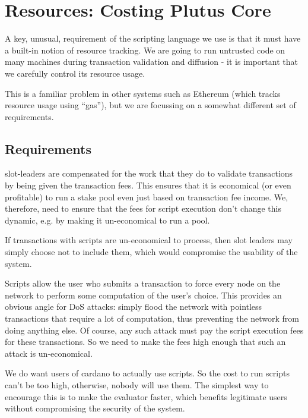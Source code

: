 \section{Resources: Costing Plutus Core}
\label{sec:costing}

A key, unusual, requirement of the scripting language we use is that it must have a built-in notion of resource tracking.
We are going to run untrusted code on many machines during transaction validation and diffusion - it is important that we carefully control its resource usage.

This is a familiar problem in other systems such as Ethereum (which tracks resource usage using ``gas''), but we are focussing on a somewhat different set of requirements.

\subsection{Requirements}
\begin{requirement}
\label{req:costing-profitability}
\Glspl{slot-leader} are compensated for the work that they do to validate transactions by being given the transaction fees.
This ensures that it is economical (or even profitable) to run a stake pool even just based on transaction fee income.
We, therefore, need to ensure that the fees for script execution don't change this dynamic, e.g. by making it un-economical to run a pool.

If transactions with scripts are un-economical to process, then slot leaders may simply choose not to include them, which would compromise the usability of the system.
\end{requirement}

\begin{requirement}
\label{req:costing-dos}
Scripts allow the user who submits a transaction to force every node on the network to perform some computation of the user's choice.
This provides an obvious angle for DoS attacks: simply flood the network with pointless transactions that require a lot of computation, thus preventing the network from doing anything else.
Of course, any such attack must pay the script execution fees for these transactions.
So we need to make the fees high enough that such an attack is un-economical.
\end{requirement}

\begin{requirement}
\label{req:costing-usable}
We do want users of \gls{cardano} to actually use scripts.
So the cost to run scripts can't be too high, otherwise, nobody will use them.
The simplest way to encourage this is to make the evaluator faster, which benefits legitimate users without compromising the security of the system.
\end{requirement}

